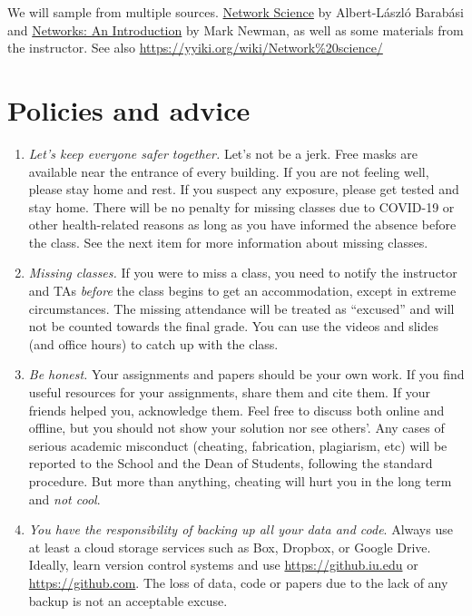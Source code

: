\documentclass[11pt,article,oneside]{memoir} %
\begin{document}
We will sample from multiple sources. 
\href{http://barabasi.com/networksciencebook/}{Network Science} by Albert-László
Barabási and
\href{https://www.amazon.com/Networks-Mark-Newman/dp/0198805098}{Networks:
An Introduction} by Mark Newman, as well as some materials from the instructor. See also \url{https://yyiki.org/wiki/Network%20science/} 

\section{Policies and advice} %

\begin{enumerate}

\item \emph{Let's keep everyone safer together.} Let's not be a jerk. 
Free masks are available near the entrance of every building. 
If you are not feeling well, please stay home and rest. 
If you suspect any exposure, please get tested and stay home. 
There will be no penalty for missing classes due to COVID-19 or other health-related reasons as long as you have informed the absence before the class. 
See the next item for more information about missing classes. 

\item \emph{Missing classes.} 
If you were to miss a class, you need to notify the instructor and TAs \emph{before} the class begins to get an accommodation, except in extreme circumstances. 
The missing attendance will be treated as ``excused'' and will not be counted towards the final grade.
You can use the videos and slides (and office hours) to catch up with the class. 

\item \emph{Be honest.} Your assignments and papers should be your own work.  
If you find useful resources for your assignments, share them and cite them. 
If your friends helped you, acknowledge them. 
Feel free to discuss both online and offline, but you should not show your solution nor see others'.  
Any cases of serious academic misconduct (cheating, fabrication, plagiarism, etc) will be reported to the School and the Dean of Students, following the standard procedure. 
But more than anything, cheating will hurt you in the long term and \emph{not cool}.

\item \emph{You have the responsibility of backing up all your data and code}.
Always use at least a cloud storage services such as Box, Dropbox, or Google Drive. 
Ideally, learn version control systems and use \url{https://github.iu.edu} or \url{https://github.com}. 
The loss of data, code or papers due to the lack of any backup is not an acceptable excuse.


\end{enumerate}
\end{document}
